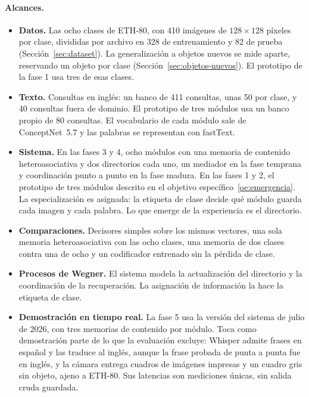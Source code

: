 \paragraph{Alcances.}
\begin{itemize}
    \item \textbf{Datos.} Las ocho clases de ETH-80, con 410 imágenes de $128\times128$
    píxeles por clase, divididas por archivo en 328 de entrenamiento y 82 de prueba
    (Sección~\ref{sec:dataset}).
    La generalización a objetos nuevos se mide aparte, reservando un objeto por clase
    (Sección~\ref{sec:objetos-nuevos}).
    El prototipo de la fase 1 usa tres de esas clases.
    \item \textbf{Texto.} Consultas en inglés: un banco de 411 consultas, unas 50 por
    clase, y 40 consultas fuera de dominio.
    El prototipo de tres módulos usa un banco propio de 80 consultas.
    El vocabulario de cada módulo sale de ConceptNet~5.7 y las palabras se representan
    con fastText.
    \item \textbf{Sistema.} En las fases 3 y 4, ocho módulos con una memoria de contenido
    heteroasociativa y dos directorios cada uno, un mediador en la fase temprana y
    coordinación punto a punto en la fase madura.
    En las fases 1 y 2, el prototipo de tres módulos descrito en el objetivo
    específico~\ref{oe:emergencia}.
    La especialización es asignada: la etiqueta de clase decide qué módulo guarda cada
    imagen y cada palabra.
    Lo que emerge de la experiencia es el directorio.
    \item \textbf{Comparaciones.} Decisores simples sobre los mismos vectores, una sola
    memoria heteroasociativa con las ocho clases, una memoria de dos clases contra una de
    ocho y un codificador entrenado sin la pérdida de clase.
    \item \textbf{Procesos de Wegner.} El sistema modela la actualización del directorio
    y la coordinación de la recuperación.
    La asignación de información la hace la etiqueta de clase.
    \item \textbf{Demostración en tiempo real.} La fase 5 usa la versión del sistema de
    julio de 2026, con tres memorias de contenido por módulo.
    Toca como demostración parte de lo que la evaluación excluye: Whisper admite frases
    en español y las traduce al inglés, aunque la frase probada de punta a punta fue en
    inglés, y la cámara entrega cuadros de imágenes impresas y un cuadro gris sin objeto,
    ajeno a ETH-80.
    Sus latencias son mediciones únicas, sin salida cruda guardada.
\end{itemize}

